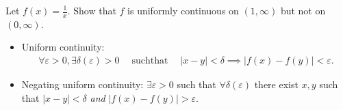 Let \(f(x) = \frac 1 x\). Show that \(f\) is uniformly continuous on
\((1, \infty)\) but not on \((0,\infty)\).

\begin{concept}

\envlist

\begin{itemize}
\tightlist
\item
  Uniform continuity:
  \begin{align*}  
  \forall \varepsilon>0, \exists \delta(\varepsilon)>0 {\quad \operatorname{such that} \quad} {\left\lvert {x-y} \right\rvert}<\delta \implies {\left\lvert {f(x) - f(y)} \right\rvert} < \varepsilon
  .\end{align*}
\item
  Negating uniform continuity: \(\exists \varepsilon> 0\) such that
  \(\forall \delta(\varepsilon)\) there exist \(x, y\) such that
  \({\left\lvert {x-y} \right\rvert} < \delta\) \emph{and}
  \({\left\lvert {f(x) - f(y)} \right\rvert} > \varepsilon\).
\end{itemize}

\end{concept}

